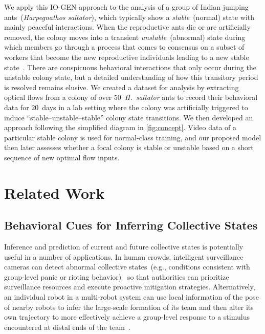 \documentclass[letterpaper]{article} %
\let\orgautoref\autoref
\renewcommand{\autoref}
{\def\equationautorefname{Equation}%
\def\figureautorefname{Fig.}%
\def\subfigureautorefname{Fig.}%
\def\Itemautorefname{item}%
\def\tableautorefname{Table}%
\def\exerciseautorefname{Exercise}%
\def\starexerciseautorefname{Exercise}%
\def\sectionautorefname{Section}%
\def\subsectionautorefname{Section}%
\def\subsubsectionautorefname{Section}%
\def\chapterautorefname{Section}%
\def\partautorefname{Part}%
\orgautoref}
\begin{document}
We apply this \mbox{IO-GEN} approach to the analysis of a group of Indian
jumping ants~(\emph{Harpegnathos saltator}), which typically show a
\emph{stable}~(normal) state with mainly peaceful interactions.
When the reproductive ants die or are artificially removed,
the colony moves into a transient \emph{unstable}~(abnormal) state during
which members go through a process that comes to consensus on a subset of
workers that become the new reproductive individuals leading to a
new stable state~\citep{SPSHPL16}.
There are conspicuous behavioral interactions that only occur during
the unstable colony state, but a detailed understanding of how this
transitory period is resolved remains elusive.
We created a dataset for analysis by
extracting optical flows from a colony of over $50$~\emph{H.~saltator}
ants to record their behavioral data for $20$~days in a lab setting
where the colony was artificially triggered to induce
``stable--unstable--stable'' colony state transitions. We then developed
an approach following the simplified diagram in \autoref{fig:concept}.
Video data of a particular stable colony is used for normal-class
training, and our proposed model then later assesses whether a focal
colony is stable or unstable based on a short sequence of new optimal
flow inputs.







\section{Related Work}
\label{sec:related_work}

\subsection{Behavioral Cues for Inferring Collective States}
\label{sec:behavioral_cues_to_differentiate_collective_states}

Inference and prediction of current and future collective states is
potentially useful in a number of applications. In human crowds,
intelligent surveillance cameras can detect abnormal collective
states~(e.g., conditions consistent with group-level panic or rioting
behavior)~\citep{MOS09} so that authorities can prioritize surveillance
resources and execute proactive mitigation strategies. Alternatively, an
individual robot in a multi-robot system can use local information of
the pose of nearby robots to infer the large-scale formation of its team
and then alter its own trajectory to more effectively achieve a
group-level response to a stimulus encountered at distal ends of the
team~\citep{CPR17, CKP20}.
\end{document}
